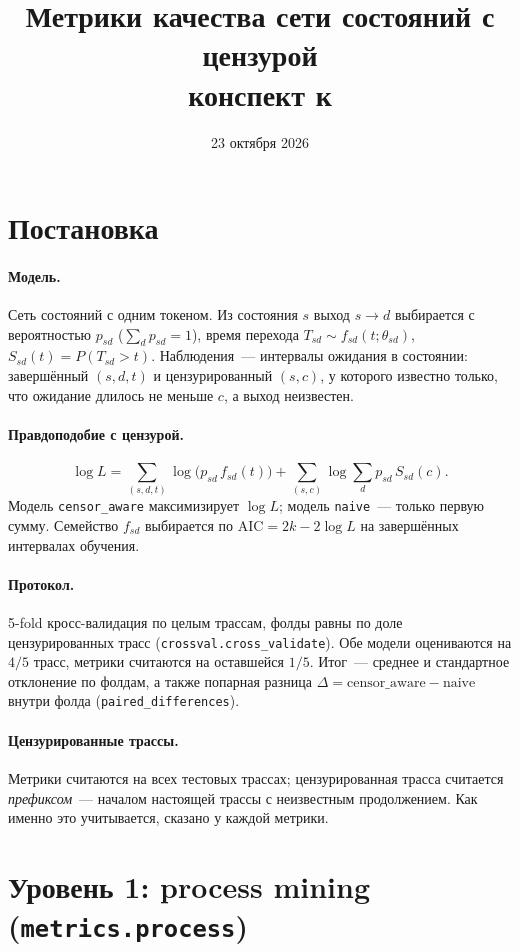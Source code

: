 \documentclass[11pt,a4paper]{article}
\title{Метрики качества сети состояний с цензурой\\\large конспект к \code{survpm.metrics}}
\date{23 октября 2026}
\newcommand{\code}[1]{\texttt{#1}}
\newcommand{\1}{\mathbf{1}}
\begin{document}
\maketitle

\section{Постановка}

\paragraph{Модель.} Сеть состояний с одним токеном. Из состояния $s$ выход $s\to d$
выбирается с вероятностью $p_{sd}$ ($\sum_d p_{sd}=1$), время перехода $T_{sd}\sim f_{sd}(t;\theta_{sd})$,
$S_{sd}(t)=P(T_{sd}>t)$. Наблюдения~--- интервалы ожидания в состоянии:
завершённый $(s,d,t)$ и цензурированный $(s,c)$, у которого известно только,
что ожидание длилось не меньше $c$, а выход неизвестен.

\paragraph{Правдоподобие с цензурой.}
\[
\log L=\sum_{(s,d,t)}\log\bigl(p_{sd}\,f_{sd}(t)\bigr)+\sum_{(s,c)}\log\sum_d p_{sd}\,S_{sd}(c).
\]
Модель \code{censor\_aware} максимизирует $\log L$; модель \code{naive}~--- только первую сумму.
Семейство $f_{sd}$ выбирается по $\mathrm{AIC}=2k-2\log L$ на завершённых интервалах обучения.

\paragraph{Протокол.} 5-fold кросс-валидация по целым трассам, фолды равны
по доле цензурированных трасс (\code{crossval.cross\_validate}). Обе модели оцениваются
на $4/5$ трасс, метрики считаются на оставшейся $1/5$. Итог~--- среднее и стандартное
отклонение по фолдам, а также попарная разница $\Delta=\text{censor\_aware}-\text{naive}$
внутри фолда (\code{paired\_differences}).

\paragraph{Цензурированные трассы.} Метрики считаются на всех тестовых трассах;
цензурированная трасса считается \emph{префиксом}~--- началом настоящей трассы с неизвестным
продолжением. Как именно это учитывается, сказано у каждой метрики.

\section{Уровень 1: process mining (\code{metrics.process})}
\end{document}
